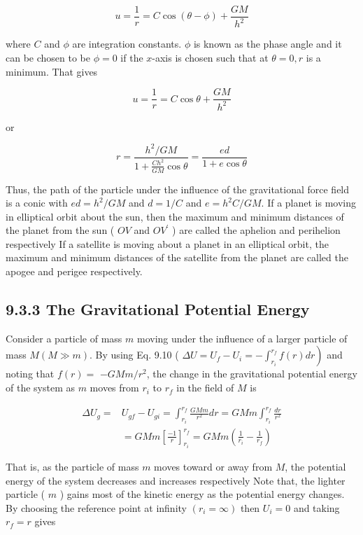 \documentclass[10pt]{article}
\begin{document}
$$
u=\frac{1}{r}=C \cos (\theta-\phi)+\frac{G M}{h^{2}}
$$

where $C$ and $\phi$ are integration constants. $\phi$ is known as the phase angle and it can be chosen to be $\phi=0$ if the $x$-axis is chosen such that at $\theta=0, r$ is a minimum. That gives


\begin{equation*}
u=\frac{1}{r}=C \cos \theta+\frac{G M}{h^{2}} \tag{9.27}
\end{equation*}


or

$$
r=\frac{h^{2} / G M}{1+\frac{C h^{2}}{G M} \cos \theta}=\frac{e d}{1+e \cos \theta}
$$

Thus, the path of the particle under the influence of the gravitational force field is a conic with $e d=h^{2} / G M$ and $d=1 / C$ and $e=h^{2} C / G M$. If a planet is moving in elliptical orbit about the sun, then the maximum and minimum distances of the planet from the sun ( $O V$ and $O V^{\prime}$ ) are called the aphelion and perihelion respectively If a satellite is moving about a planet in an elliptical orbit, the maximum and minimum distances of the satellite from the planet are called the apogee and perigee respectively.

\subsection*{9.3.3 The Gravitational Potential Energy}
Consider a particle of mass $m$ moving under the influence of a larger particle of mass $M(M \gg m)$. By using Eq. 9.10 ( $\left.\Delta U=U_{f}-U_{i}=-\int_{r_{i}}^{r_{f}} f(r) d r\right)$ and noting that $f(r)=$ $-G M m / r^{2}$, the change in the gravitational potential energy of the system as $m$ moves from $r_{i}$ to $r_{f}$ in the field of $M$ is

$$
\begin{aligned}
\Delta U_{g}= & U_{g f}-U_{g i}=\int_{r_{i}}^{r_{f}} \frac{G M m}{r^{2}} d r=G M m \int_{r_{i}}^{r_{f}} \frac{d r}{r^{2}} \\
& =G M m\left[\frac{-1}{r}\right]_{r_{i}}^{r_{f}}=G M m\left(\frac{1}{r_{i}}-\frac{1}{r_{f}}\right)
\end{aligned}
$$

That is, as the particle of mass $m$ moves toward or away from $M$, the potential energy of the system decreases and increases respectively Note that, the lighter particle ( $m$ ) gains most of the kinetic energy as the potential energy changes. By choosing the reference point at infinity $\left(r_{i}=\infty\right)$ then $U_{i}=0$ and taking $r_{f}=r$ gives
\end{document}
